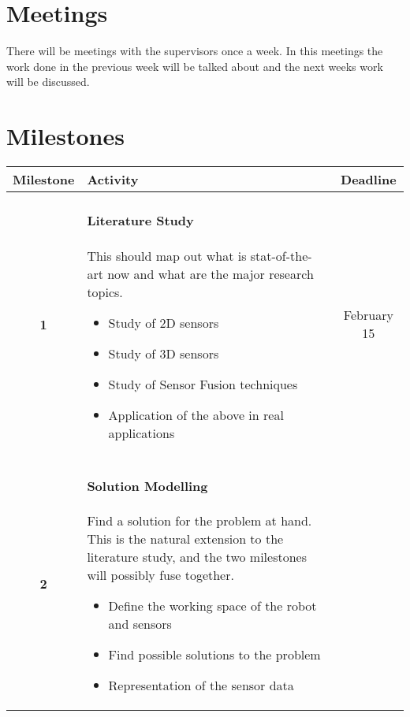 \documentclass[a4paper, 10pt]{article}
\begin{document}
\section{Meetings}
There will be meetings with the supervisors once a week. In this meetings the work done in
the previous week will be talked about and the next weeks work will be discussed.  


\section{Milestones}
\begin{tabular}{| c | p{11.5cm} || c |}
    \hline
        Milestone   &   Activity    &   Deadline \\
    \hline
    \hline
        \textbf{1}  &   \paragraph{Literature Study} This should map out what is
                        stat-of-the-art now and what are the major research topics.
                        \begin{itemize}
                            \item Study of 2D sensors 
                            \item Study of 3D sensors
                            \item Study of Sensor Fusion techniques
                            \item Application of the above in real applications
                        \end{itemize}
                                                       
                                                       & February 15 \\
        \hline
        \textbf{2}  &   \paragraph{Solution Modelling} Find a solution for the problem
                        at hand. This is the natural extension to the literature study,
                        and the two milestones will possibly fuse together. 
                        \begin{itemize}
                            \item Define the working space of the robot and sensors 
                            \item Find possible solutions to the problem 
                            \item Representation of the sensor data
                        \end{itemize}
                                   

\end{tabular}
\end{document}
